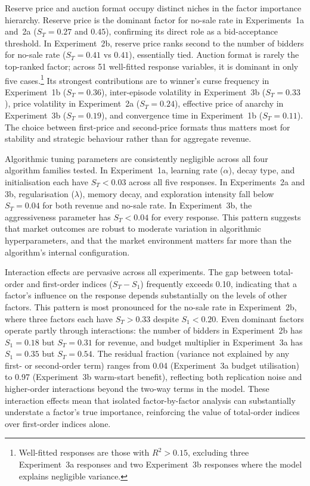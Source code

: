 Reserve price and auction format occupy distinct niches in the factor importance hierarchy. Reserve price is the dominant factor for no-sale rate in Experiments~1a and~2a ($S_T = 0.27$ and $0.45$), confirming its direct role as a bid-acceptance threshold. In Experiment~2b, reserve price ranks second to the number of bidders for no-sale rate ($S_T = 0.41$ vs $0.41$), essentially tied. Auction format is rarely the top-ranked factor; across 51 well-fitted response variables, it is dominant in only five cases.\footnote{Well-fitted responses are those with $R^2 > 0.15$, excluding three Experiment~3a responses and two Experiment~3b responses where the model explains negligible variance.} Its strongest contributions are to winner's curse frequency in Experiment~1b ($S_T = 0.36$), inter-episode volatility in Experiment~3b ($S_T = 0.33$), price volatility in Experiment~2a ($S_T = 0.24$), effective price of anarchy in Experiment~3b ($S_T = 0.19$), and convergence time in Experiment~1b ($S_T = 0.11$). The choice between first-price and second-price formats thus matters most for stability and strategic behaviour rather than for aggregate revenue.

Algorithmic tuning parameters are consistently negligible across all four algorithm families tested. In Experiment~1a, learning rate ($\alpha$), decay type, and initialisation each have $S_T < 0.03$ across all five responses. In Experiments~2a and 3b, regularisation ($\lambda$), memory decay, and exploration intensity fall below $S_T = 0.04$ for both revenue and no-sale rate. In Experiment~3b, the aggressiveness parameter has $S_T < 0.04$ for every response. This pattern suggests that market outcomes are robust to moderate variation in algorithmic hyperparameters, and that the market environment matters far more than the algorithm's internal configuration.

Interaction effects are pervasive across all experiments. The gap between total-order and first-order indices ($S_T - S_1$) frequently exceeds 0.10, indicating that a factor's influence on the response depends substantially on the levels of other factors. This pattern is most pronounced for the no-sale rate in Experiment~2b, where three factors each have $S_T > 0.33$ despite $S_1 < 0.20$. Even dominant factors operate partly through interactions: the number of bidders in Experiment~2b has $S_1 = 0.18$ but $S_T = 0.31$ for revenue, and budget multiplier in Experiment~3a has $S_1 = 0.35$ but $S_T = 0.54$. The residual fraction (variance not explained by any first- or second-order term) ranges from 0.04 (Experiment~3a budget utilisation) to 0.97 (Experiment~3b warm-start benefit), reflecting both replication noise and higher-order interactions beyond the two-way terms in the model. These interaction effects mean that isolated factor-by-factor analysis can substantially understate a factor's true importance, reinforcing the value of total-order indices over first-order indices alone.
